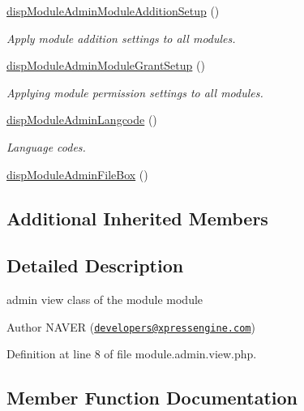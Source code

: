 \begin{DoxyCompactItemize}
\hyperlink{classmoduleAdminView_aa880758b1a06f6ba2417311b1a1a9fc8}{disp\+Module\+Admin\+Module\+Addition\+Setup} ()
\begin{DoxyCompactList}\small\item\em Apply module addition settings to all modules. \end{DoxyCompactList}\item 
\hyperlink{classmoduleAdminView_a132b98243602c81f583f4746a04628d7}{disp\+Module\+Admin\+Module\+Grant\+Setup} ()
\begin{DoxyCompactList}\small\item\em Applying module permission settings to all modules. \end{DoxyCompactList}\item 
\hyperlink{classmoduleAdminView_af7dbb67dd855f4acb840b6ffbdf4a80c}{disp\+Module\+Admin\+Langcode} ()
\begin{DoxyCompactList}\small\item\em Language codes. \end{DoxyCompactList}\item 
\hyperlink{classmoduleAdminView_a71cf5716a6b8d0dde832c2e171518bdd}{disp\+Module\+Admin\+File\+Box} ()
\end{DoxyCompactItemize}
\subsection*{Additional Inherited Members}


\subsection{Detailed Description}
admin view class of the module module 

\begin{DoxyAuthor}{Author}
N\+A\+V\+ER (\href{mailto:developers@xpressengine.com}{\tt developers@xpressengine.\+com}) 
\end{DoxyAuthor}


Definition at line 8 of file module.\+admin.\+view.\+php.



\subsection{Member Function Documentation}
\mbox{\label{classmoduleAdminView_a1e6312f7a841064603ba51ad835f4e28}} 
